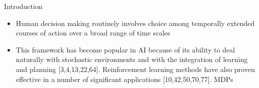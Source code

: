 \begin{frame}{Introduction}
    \begin{itemize}
        \item Human decision making routinely involves choice among temporally extended courses of action over a broad range of time scales
        \item {\color{red} This framework has become popular in AI because of its ability to deal naturally with stochastic environments and with the integration of learning and planning [3,4,13,22,64]. Reinforcement learning methods have also proven effective in a number of significant applications [10,42,50,70,77]. MDPs}
    \end{itemize}
\end{frame}

